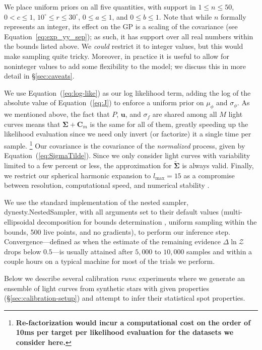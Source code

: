\documentclass[modern,linenumbers]{aastex62}
\newcommand{\edited}[1]{\textbf{#1}}
\begin{document}
We place uniform priors on all five quantities, with support in
$1 \leq n \leq 50$, $0 < c \leq 1$,
$10^\circ \leq r \leq 30^\circ$,
$0 \leq a \leq 1$, and
$0 \leq b \leq 1$. Note that while $n$ formally represents an integer,
its effect on the GP is a scaling of the covariance (see Equation~\ref{eq:exp_yy_sep});
as such, it has support over all real numbers within the bounds listed
above. We \emph{could} restrict it to integer values, but this would make
sampling quite tricky. Moreover, in practice it is useful to allow for
noninteger values to add some flexibility to the model; we discuss this
in more detail in \S\ref{sec:caveats}.

We use Equation~(\ref{eq:log-like}) as our log likelihood
term, adding the log of the absolute value of Equation~(\ref{eq:J}) to
enforce a uniform prior on $\mu_\phi$ and $\sigma_\phi$. As we mentioned
above, the fact that $P$, $\mathbf{u}$, and $\sigma_f$ are shared among
all $M$ light curves means that $\pmb{\Sigma} + \mathbf{C}_m$ is the same for all
of them, greatly speeding up the likelihood evaluation since we need
only invert (or factorize) it a single time per sample.%
%
\footnote{\edited{Re-factorization would incur a computational cost
        on the order of 10ms per target per likelihood evaluation for the
        datasets we consider here.}}
%
Our
covariance is the covariance of the \emph{normalized} process,
given by Equation~(\ref{eq:SigmaTilde}). Since we only consider light curves
with variability limited to a few percent or less, the approximation for
$\tilde{\pmb{\Sigma}}$ is always valid. Finally, we restrict our spherical
harmonic expansion to $l_\mathrm{max} = 15$ as a compromise between
resolution, computational speed, and numerical stability \citep[see][]{JOSSPaper}.

We use the standard implementation of the nested sampler,
\textsf{dynesty.NestedSampler}, with all arguments set to their
default values
(multi-ellipsoidal decomposition for bounds determination \citep{Feroz2009},
uniform sampling within the bounds,
500 live points,
and no gradients), to perform our inference step.
Convergence---defined as when the estimate of the remaining evidence $\Delta\ln \mathcal{Z}$ drops
below $0.5$---is usually attained after $5{,}000$ to $10{,}000$ samples and
within a couple hours on a typical machine for most of the trials we perform.

Below we describe several calibration \emph{runs}: experiments where we generate
an ensemble of light curves from synthetic stars with given properties
(\S\ref{sec:calibration-setup}) and attempt to infer their statistical spot
properties.
\end{document}
